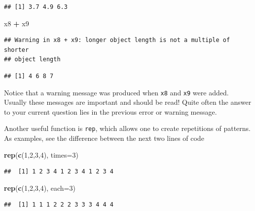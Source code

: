 \documentclass[]{book}
\newenvironment{Shaded}{\begin{snugshade}}{\end{snugshade}}
\newcommand{\KeywordTok}[1]{\textcolor[rgb]{0.13,0.29,0.53}{\textbf{#1}}}
\newcommand{\DataTypeTok}[1]{\textcolor[rgb]{0.13,0.29,0.53}{#1}}
\newcommand{\DecValTok}[1]{\textcolor[rgb]{0.00,0.00,0.81}{#1}}
\newcommand{\StringTok}[1]{\textcolor[rgb]{0.31,0.60,0.02}{#1}}
\newcommand{\OperatorTok}[1]{\textcolor[rgb]{0.81,0.36,0.00}{\textbf{#1}}}
\newcommand{\NormalTok}[1]{#1}
\theoremstyle{definition}
\theoremstyle{definition}
\theoremstyle{remark}
\begin{document}
\begin{verbatim}
## [1] 3.7 4.9 6.3
\end{verbatim}

\begin{Shaded}
\begin{Highlighting}[]
\NormalTok{x8 }\OperatorTok{+}\StringTok{ }\NormalTok{x9}
\end{Highlighting}
\end{Shaded}

\begin{verbatim}
## Warning in x8 + x9: longer object length is not a multiple of shorter
## object length
\end{verbatim}

\begin{verbatim}
## [1] 4 6 8 7
\end{verbatim}

Notice that a warning message was produced when \texttt{x8} and
\texttt{x9} were added. Usually these messages are important and should
be read! Quite often the answer to your current question lies in the
previous error or warning message.

Another useful function is \texttt{rep}, which allows one to create
repetitions of patterns. As examples, see the difference between the
next two lines of code

\begin{Shaded}
\begin{Highlighting}[]
\KeywordTok{rep}\NormalTok{(}\KeywordTok{c}\NormalTok{(}\DecValTok{1}\NormalTok{,}\DecValTok{2}\NormalTok{,}\DecValTok{3}\NormalTok{,}\DecValTok{4}\NormalTok{), }\DataTypeTok{times=}\DecValTok{3}\NormalTok{)}
\end{Highlighting}
\end{Shaded}

\begin{verbatim}
##  [1] 1 2 3 4 1 2 3 4 1 2 3 4
\end{verbatim}

\begin{Shaded}
\begin{Highlighting}[]
\KeywordTok{rep}\NormalTok{(}\KeywordTok{c}\NormalTok{(}\DecValTok{1}\NormalTok{,}\DecValTok{2}\NormalTok{,}\DecValTok{3}\NormalTok{,}\DecValTok{4}\NormalTok{), }\DataTypeTok{each=}\DecValTok{3}\NormalTok{)}
\end{Highlighting}
\end{Shaded}

\begin{verbatim}
##  [1] 1 1 1 2 2 2 3 3 3 4 4 4
\end{verbatim}
\end{document}
